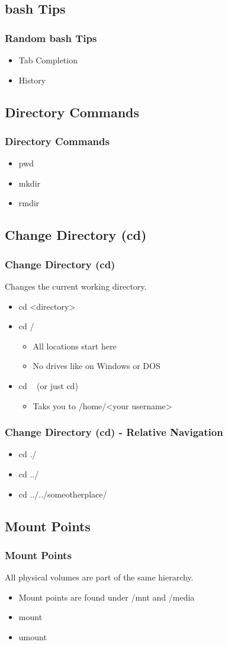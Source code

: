 \documentclass[hyperref={pdfpagelabels=false}]{beamer}
\begin{document}
\subsection{bash Tips}	
\frame
{
    \frametitle{Random bash Tips}
    \begin{itemize}
    \item{Tab Completion}
    \item{History}
    \end{itemize}
}
\subsection{Directory Commands}
\frame
{
    \frametitle{Directory Commands}
    \begin{itemize}
    \item{pwd}
    \item{mkdir}
    \item{rmdir}
    \end{itemize}
}
\subsection{Change Directory (cd)}
\frame
{
    \frametitle{Change Directory (cd)}
    Changes the current working directory.
    \begin{itemize}
    \item{cd <directory>}
    \item{cd /}
        \begin{itemize}
        \item{All locations start here}
        \item{No drives like on Windows or DOS}
        \end{itemize}
    \item{cd ~ (or just cd)}
        \begin{itemize}
        \item{Taks you to /home/<your username>}
        \end{itemize}
    \end{itemize}
}
\frame
{
    \frametitle{Change Directory (cd) - Relative Navigation}
    \begin{itemize}
    \item{cd ./}
    \item{cd ../}
    \item{cd ../../someotherplace/}
    \end{itemize}
}
\subsection{Mount Points}
\frame
{
    \frametitle{Mount Points}
    All physical volumes are part of the same hierarchy.
    \begin{itemize}
    \item{Mount points are found under /mnt and /media}
    \item{mount}
    \item{umount}
    \end{itemize}
}
\end{document}
